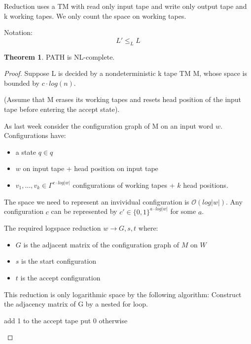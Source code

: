 \documentclass[a4paper,12pt]{article}
\theoremstyle{definition}
\newtheorem{theorem}[counter]{Theorem}
\theoremstyle{remark}
\begin{document}
Reduction uses a TM with read only input tape and write only output tape and k working tapes. We only count the space on working tapes.

Notation:
\begin{equation*}
    L' \leq_L L
\end{equation*}

\begin{theorem}
    PATH is NL-complete.
\end{theorem}

\begin{proof}
    Suppose L is decided by a nondeterministic k tape TM M, whose space is bounded by $c \cdot log(n)$.

    (Assume that M erases its working tapes and resets head position of the input tape before entering the accept state).

    As last week consider the configuration graph of M on an input word $w$. Configurations have:
    \begin{itemize}
        \item a state $q \in q$
        \item $w$ on input tape + head position on input tape
        \item $v_1, \dots, v_k \in \Gamma^{c \cdot log |w|}$ configurations of working tapes + $k$ head positions.
    \end{itemize}

    The space we need to represent an invividual configuration is $\mathscr{O}(log |w|)$. Any configuration $c$ can be represented
    by $c' \in \{0, 1\}^{a \cdot log|w|}$ for some $a$.

    The required logspace reduction $w \to G, s, t$ where:
    \begin{itemize}
        \item $G$ is the adjacent matrix of the configuration graph of $M$ on $W$
        \item $s$ is the start configuration
        \item $t$ is the accept configuration
    \end{itemize}

    This reduction is only logarithmic space by the following algorithm:
    Construct the adjacency matrix of G by a nested for loop.

    \begin{algorithm}[H]
        \begin{algorithmic}[1]
                        \State add 1 to the accept tape
                    \Else
                        \State put 0 otherwise
                    \EndIf
                \EndFor
            \EndFor
        \end{algorithmic}
        \end{algorithm}
\end{proof}
\end{document}
